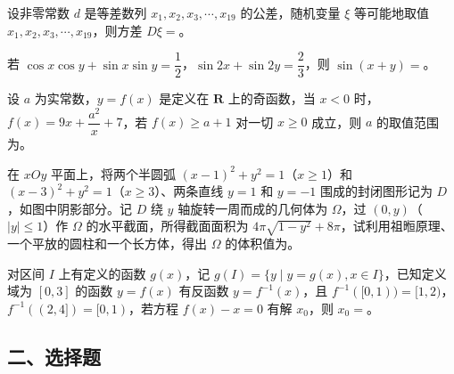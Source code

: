 \begin{question}
设非零常数 $d$ 是等差数列 $x_1,x_2,x_3,\cdots,x_{19}$ 的公差，随机变量 $\xi$ 等可能地取值 $x_1,x_2,x_3,\cdots,x_{19}$，则方差 $D\xi=$\gkblank{}。

\end{question}
\begin{question}
若 $\cos x\cos y+\sin x\sin y=\dfrac12$，$\sin 2x+\sin 2y=\dfrac23$，则 $\sin(x+y)=$\gkblank{}。

\end{question}
\begin{question}
设 $a$ 为实常数，$y=f(x)$ 是定义在 $\mathbf R$ 上的奇函数，当 $x<0$ 时，$f(x)=9x+\dfrac{a^2}{x}+7$，若 $f(x)\geqslant a+1$ 对一切 $x\geqslant0$ 成立，则 $a$ 的取值范围为\gkblank{}。

\Needspace{0.4\textheight}
\end{question}
\begin{question}
在 $xOy$ 平面上，将两个半圆弧 $(x-1)^2+y^2=1$（$x\geqslant1$）和 $(x-3)^2+y^2=1$（$x\geqslant3$）、两条直线 $y=1$ 和 $y=-1$ 围成的封闭图形记为 $D$，如图中阴影部分。记 $D$ 绕 $y$ 轴旋转一周而成的几何体为 $\Omega$，过 $(0,y)$（$|y|\leqslant1$）作 $\Omega$ 的水平截面，所得截面面积为 $4\pi\sqrt{1-y^2}+8\pi$，试利用祖暅原理、一个平放的圆柱和一个长方体，得出 $\Omega$ 的体积值为\gkblank{}。
\nopagebreak[4]
\begin{center}\end{center}
\nopagebreak[4]
\end{question}
\begin{question}
对区间 $I$ 上有定义的函数 $g(x)$，记 $g(I)=\{y\mid y=g(x),x\in I\}$，已知定义域为 $[0,3]$ 的函数 $y=f(x)$ 有反函数 $y=f^{-1}(x)$，且 $f^{-1}([0,1))=[1,2)$，$f^{-1}((2,4])=[0,1)$，若方程 $f(x)-x=0$ 有解 $x_0$，则 $x_0=$\gkblank{}。

\end{question}
\begingroup
\renewcommand{\gkpart}[1]{\Needspace{0.4\textheight}\subsection*{#1}\nopagebreak}
\gkpart{二、选择题}
\endgroup

